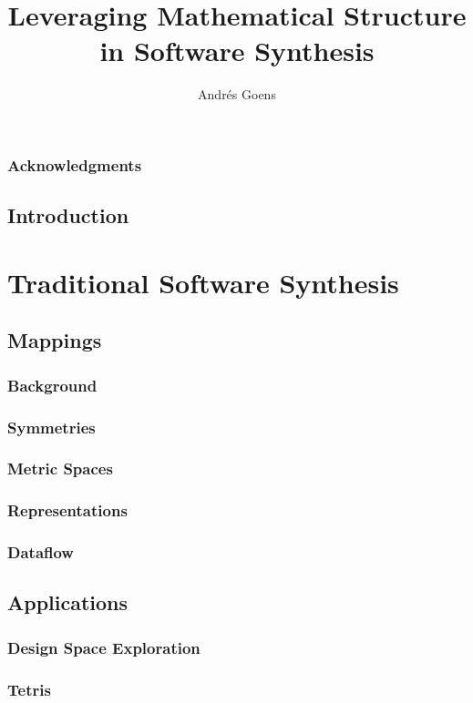 \documentclass{report}
\title{Leveraging Mathematical Structure in Software Synthesis}
\author{Andr\'{e}s Goens}
\begin{document}
\date{}

\maketitle
\tableofcontents
\clearpage
\section*{Acknowledgments}

\chapter{Introduction}

\part{Traditional Software Synthesis}

\chapter{Mappings}

\section{Background}
\section{Symmetries}
\section{Metric Spaces}
\section{Representations}
\section{Dataflow}

\chapter{Applications}

\section{Design Space Exploration}
\section{Tetris}
\end{document}
